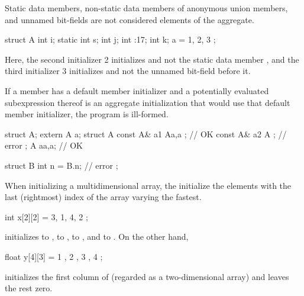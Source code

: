 \pnum
\begin{note}
Static data members,
non-static data members of anonymous union members,
and
unnamed bit-fields
are not considered elements of the aggregate.
\begin{example}
\begin{codeblock}
struct A {
  int i;
  static int s;
  int j;
  int :17;
  int k;
} a = { 1, 2, 3 };
\end{codeblock}

Here, the second initializer 2 initializes
and not the static data member
, and the third initializer 3 initializes 
and not the unnamed bit-field before it.
\end{example}
\end{note}

\pnum
If a member has a default member initializer
and a potentially evaluated subexpression thereof is an aggregate
initialization that would use that default member initializer,
the program is ill-formed.
\begin{example}
\begin{codeblock}
struct A;
extern A a;
struct A {
  const A& a1 { A{a,a} };       // OK
  const A& a2 { A{} };          // error
};
A a{a,a};                       // OK

struct B {
  int n = B{}.n;                // error
};
\end{codeblock}
\end{example}

\pnum
When initializing a multidimensional array,
the
initialize the elements with the last (rightmost) index of the array
varying the fastest.
\begin{example}
\begin{codeblock}
int x[2][2] = { 3, 1, 4, 2 };
\end{codeblock}
initializes
to
,
to
,
to
,
and
to
.
On the other hand,
\begin{codeblock}
float y[4][3] = {
  { 1 }, { 2 }, { 3 }, { 4 }
};
\end{codeblock}
initializes the first column of
(regarded as a two-dimensional array)
and leaves the rest zero.
\end{example}

